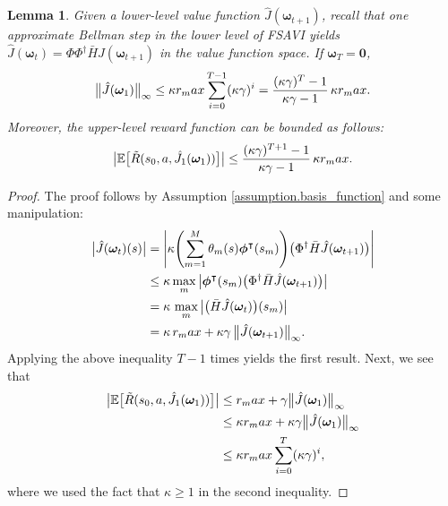 \documentclass[11pt, notitlepage]{article}
\newcommand{\E}{\mathbb{E}}
\newcommand{\1}{\mathbbm{1}}
\newtheorem{lemma}{Lemma}[section]
\begin{document}
\begin{lemma}
\label{lemma.expansion_lower}
Given a lower-level value function $\hat{J}(\boldsymbol{\omega}_{t+1})$, recall that one approximate Bellman step in the lower level of FSAVI yields $\hat{J}(\boldsymbol{\omega}_{t}) = \Phi \Phi^{\dagger} \bar{H} \hat{J}(\boldsymbol{\omega}_{t+1})$ in the value function space.
If $\boldsymbol{\omega}_{T} = \mathbf{0}$,
\[
\bigl \|\hat{J}(\boldsymbol{\omega}_{1}) \bigr\|_\infty \le \kappa r_\textnormal{max} \sum_{i=0}^{T-1} (\kappa \gamma)^i = \frac{(\kappa\gamma)^T - 1}{\kappa\gamma - 1} \, \kappa r_\textnormal{max}.
\]
Moreover, the upper-level reward function can be bounded as follows:
\[
\bigl|\E\bigl[\tilde{R}(s_0, a, \hat{J}_1(\boldsymbol{\omega}_1))\bigr]\bigr| \le \frac{(\kappa\gamma)^{T+1} - 1}{\kappa\gamma - 1} \, \kappa r_\textnormal{max}.
\]
\end{lemma}
\begin{proof}
The proof follows by Assumption \ref{assumption.basis_function} and some manipulation:
\begin{align*}
\bigl|\hat{J}(\boldsymbol{\omega}_{t})(s) \bigr|
&= \Biggl| \kappa \Biggl( \sum_{m=1}^M \theta_m(s) \boldsymbol{\phi}^\intercal(s_m) \Biggr) \bigl(\Phi^{\dagger} \bar{H} \hat{J}(\boldsymbol{\omega}_{t+1})\bigr) \Biggr| \\
&\le \kappa \max_m \,  \bigl| \boldsymbol{\phi}^\intercal(s_m) \bigl(\Phi^{\dagger} \bar{H} \hat{J}(\boldsymbol{\omega}_{t+1}) \bigr) \bigr|\\
&= \kappa \, \max_m \, \bigl|
 \bigl(\bar{H}\hat{J}(\boldsymbol{\omega}_{t})\bigr)(s_m) \bigr|\\
&= \kappa \, r_\textnormal{max} + \kappa \gamma \, \bigl \| \hat{J}(\boldsymbol{\omega}_{t+1}) \bigr \|_\infty.
\end{align*}
Applying the above inequality $T-1$ times yields the first result. Next, we see that
\begin{align*}
\bigl|\E\bigl[\tilde{R}(s_0, a, \hat{J}_1(\boldsymbol{\omega}_1))\bigr]\bigr| &\le r_\textnormal{max} + \gamma \bigl \|\hat{J}(\boldsymbol{\omega}_{1}) \bigr\|_\infty\\
&\le \kappa r_\textnormal{max} + \kappa \gamma \bigl \|\hat{J}(\boldsymbol{\omega}_{1}) \bigr\|_\infty\\
&\le \kappa r_\textnormal{max} \sum_{i=0}^{T} (\kappa \gamma)^i,
\end{align*}
where we used the fact that $\kappa \ge 1$ in the second inequality.
\end{proof}
\end{document}
